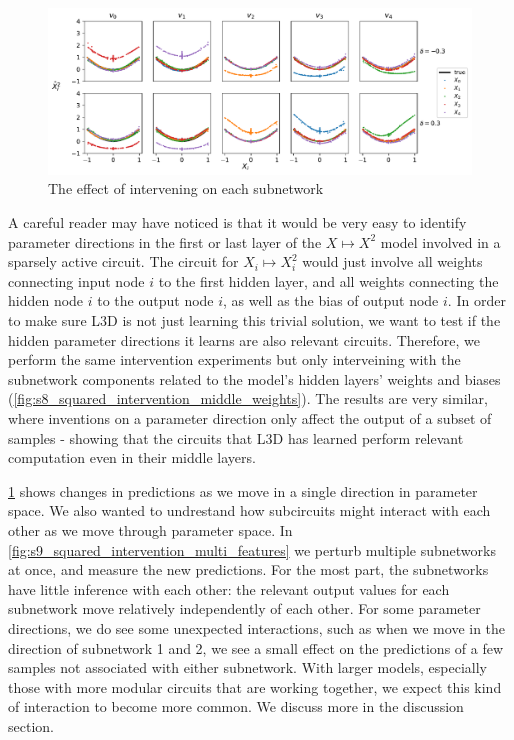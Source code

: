 \documentclass{article}
\theoremstyle{plain}
\theoremstyle{definition}
\theoremstyle{remark}
\begin{document}
\begin{figure}[htbp]
    \centerline{\includegraphics[width=\textwidth]{../figures/9_squared_intervention.pdf}}
    \centering
    \caption{The effect of intervening on each subnetwork}\label{fig:9_squared_intervention}
\end{figure}


A careful reader may have noticed is that it would be very easy to identify parameter directions in the first or last layer of the $X \mapsto X^2$ model involved in a sparsely active circuit. The circuit for $X_i \mapsto X_i^2$ would just involve all weights connecting input node $i$ to the first hidden layer, and all weights connecting the hidden node $i$ to the output node $i$, as well as the bias of output node $i$. In order to make sure L3D is not just learning this trivial solution, we want to test if the hidden parameter directions it learns are also relevant circuits. Therefore, we perform the same intervention experiments but only interveining with the subnetwork components related to the model's hidden layers' weights and biases (\ref{fig:s8_squared_intervention_middle_weights}). The results are very similar, where inventions on a parameter direction only affect the output of a subset of samples - showing that the circuits that L3D has learned perform relevant computation even in their middle layers. 



\ref{fig:9_squared_intervention} shows changes in predictions as we move in a single direction in parameter space. We also wanted to undrestand how subcircuits might interact with each other as we move through parameter space. In \ref{fig:s9_squared_intervention_multi_features} we perturb multiple subnetworks at once, and measure the new predictions. For the most part, the subnetworks have little inference with each other: the relevant output values for each subnetwork move relatively independently of each other. For some parameter directions, we do see some unexpected interactions, such as when we move in the direction of subnetwork 1 and 2, we see a small effect on the predictions of a few samples not associated with either subnetwork. With larger models, especially those with more modular circuits that are working together, we expect this kind of interaction to become more common. We discuss more in the discussion section. 
\end{document}
